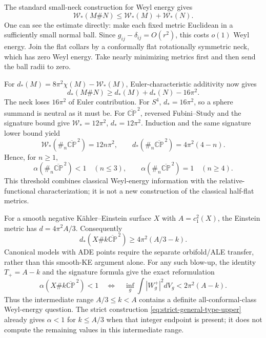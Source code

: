 \documentclass[11pt]{article}
\newcommand{\CP}{\mathbb{CP}}
\theoremstyle{definition}
\theoremstyle{remark}
\begin{document}
The standard small-neck construction for Weyl energy gives
\begin{equation}
 \mathcal W_*(M\#N)\le\mathcal W_*(M)+\mathcal W_*(N).
 \label{eq:W-subadd}
\end{equation}
One can see the estimate directly: make each fixed metric Euclidean in
a sufficiently small normal ball. Since $g_{ij}-\delta_{ij}=O(r^2)$,
this costs $o(1)$ Weyl energy. Join the flat collars by a conformally
flat rotationally symmetric neck, which has zero Weyl energy.
Take nearly minimizing metrics first and then send the ball radii to zero.

For $d_*(M)=8\pi^2\chi(M)-\mathcal W_*(M)$,
Euler-characteristic additivity now gives
\begin{equation}
 \boxed{d_*(M\#N)\ge d_*(M)+d_*(N)-16\pi^2.}
 \label{eq:deficit-sum}
\end{equation}
The neck loses $16\pi^2$ of Euler contribution. For $S^4$,
$d_*=16\pi^2$, so a sphere summand is neutral as it must be.
For $\overline{\CP}^{\,2}$, reversed Fubini--Study and the signature
bound give $\mathcal W_*=12\pi^2$, $d_*=12\pi^2$.
Induction and the same signature lower bound yield
\begin{equation}
 \mathcal W_*(\#_n\overline{\CP}^{\,2})=12n\pi^2,\qquad
 d_*(\#_n\overline{\CP}^{\,2})=4\pi^2(4-n).
 \label{eq:ncp-W}
\end{equation}
Hence, for $n\ge1$,
\begin{equation}
 \alpha(\#_n\overline{\CP}^{\,2})<1\quad(n\le3),\qquad
 \alpha(\#_n\overline{\CP}^{\,2})=1\quad(n\ge4).
 \label{eq:ncp-threshold}
\end{equation}
This threshold combines classical Weyl-energy information with the
relative-functional characterization; it is not a new construction of
the classical half-flat metrics.

For a smooth negative K\"ahler--Einstein surface $X$ with $A=c_1^2(X)$,
the Einstein metric has $d=4\pi^2A/3$. Consequently
\begin{equation}
 d_*(X\#k\overline{\CP}^{\,2})\ge4\pi^2(A/3-k).
 \label{eq:KE-deficit}
\end{equation}
Canonical models with ADE points require the separate orbifold/ALE
transfer, rather than this smooth-KE argument alone.
For any such blow-up, the identity $T_+=A-k$ and the signature formula
give the exact reformulation
\begin{equation}
 \boxed{\alpha(X\#k\overline{\CP}^{\,2})<1
 \quad\Longleftrightarrow\quad
 \inf_g\int|W_g^+|^2dV_g<2\pi^2(A-k).}
 \label{eq:blowup-W}
\end{equation}
Thus the intermediate range $A/3\le k<A$ contains a definite
all-conformal-class Weyl-energy question. The strict construction
\eqref{eq:strict-general-type-upper} already gives $\alpha<1$ for
$k\le A/3$ when that integer endpoint is present; it does not compute
the remaining values in this intermediate range.
\end{document}
